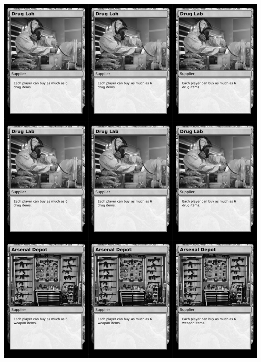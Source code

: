 \documentclass[a4paper]{article}
\begin{document}
\newpage

\begin{center}
	\centering
	\includegraphics[width=200.5mm,height=280.7mm]{output/temp/page21.png}
\end{center}
\end{document}

